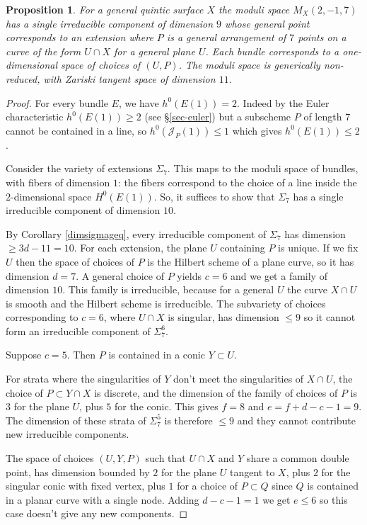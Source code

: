 \documentclass{amsart}
\theoremstyle{plain}
\newtheorem{proposition}[theorem]{Proposition}
\numberwithin{equation}{section}
\begin{document}
\begin{proposition}
For a general quintic surface $X$ the moduli space $M_X(2,-1,7)$ has
a single irreducible component of dimension $9$ whose general point
corresponds to an extension where $P$ is a 
general arrangement of $7$ points on a curve of the form $U\cap X$
for a general plane $U$. Each bundle corresponds to a one-dimensional space of choices of
$(U,P)$. The moduli space is generically non-reduced, with Zariski tangent space
of dimension $11$.
\end{proposition}
\begin{proof}
For every bundle $E$, we have $h^0(E(1))=2$. Indeed by the Euler characteristic 
$h^0(E(1))\geq 2$ (see \S \ref{sec-euler}) 
but a subscheme $P$ of length $7$ cannot be contained in
a line, so $h^0({{\mathcal J}} _P(1))\leq 1$ which gives $h^0(E(1))\leq 2$. 

Consider the variety of extensions $\Sigma _7$. This maps to the moduli space of bundles,
with fibers of dimension $1$: the fibers correspond to the choice of a line
inside the $2$-dimensional space $H^0(E(1))$. So, it suffices to show that $\Sigma _7$
has a single  irreducible component of dimension $10$. 

By Corollary \ref{dimsigmageq}, 
every irreducible component of $\Sigma _7$ has dimension $\geq 3d-11=10$.
For each extension, the plane $U$ containing $P$ is unique. If we fix $U$ then 
the space of choices of $P$ is the Hilbert scheme of a plane curve, so it has dimension 
$d=7$. A general choice of $P$ yields $c=6$ and we get a family of dimension $10$.
This family is irreducible, because for a general $U$ the curve $X\cap U$ is smooth
and the Hilbert scheme is irreducible. The subvariety of choices corresponding to 
$c=6$, where $U\cap X$
is singular, has dimension $\leq 9$ so it cannot form an irreducible component of $\Sigma _7^6$.  

Suppose $c=5$. Then $P$ is contained in a conic $Y\subset U$. 

For strata where
the singularities of $Y$ don't meet the singularities of $X\cap U$, the 
choice of $P\subset Y\cap X$ is discrete, and the dimension of the family of 
choices of $P$ is $3$ for the plane $U$,  plus $5$ for the conic. This gives $f=8$
and $e=f+d-c-1 = 9$. The dimension of these strata of $\Sigma ^5_7$ is therefore $\leq 9$
and they cannot contribute new irreducible components.

The space of choices $(U,Y,P)$ such that $U\cap X$ and $Y$ share a common double point,
has dimension bounded by $2$ for the plane $U$ tangent to $X$, plus $2$ for the
singular conic with fixed vertex, plus $1$ for a choice of $P\subset Q$ since $Q$ is
contained in a planar curve with a single node. Adding $d-c-1=1$ we get $e\leq 6$
so this case doesn't give any new components.


\end{proof}
\end{document}
